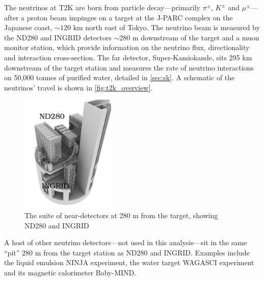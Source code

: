 The neutrinos at T2K are born from particle decay---primarily $\pi^\pm$, $K^\pm$ and $\mu^\pm$---after a proton beam impinges on a target at the J-PARC complex on the Japanese coast, $\sim 120\text{ km}$ north east of Tokyo. The neutrino beam is measured by the ND280 and INGRID detectors $\sim280$ m downstream of the target and a muon monitor station, which provide information on the neutrino flux, directionality and interaction cross-section. The far detector, Super-Kamiokande, sits 295 km downstream of the target station and measures the rate of neutrino interactions on 50,000 tonnes of purified water, detailed in \autoref{sec:sk}. A schematic of the neutrinos' travel is shown in \autoref{fig:t2k_overview}.
\begin{figure}[h]
	\includegraphics[width=0.4\textwidth, trim={10mm 0mm 0mm 0mm}, clip,page=1]{figures/det_chap/view/image_nd.jpeg}
	\caption{The suite of near-detectors at 280 m from the target, showing ND280 and INGRID}
\end{figure}

A host of other neutrino detectors---not used in this analysis---sit in the same ``pit'' 280 m from the target station as ND280 and INGRID. Examples include the liquid emulsion NINJA experiment\cite{ninja}, the water target WAGASCI\cite{wagasci} experiment and its magnetic calorimeter Baby-MIND\cite{baby_mind}.

